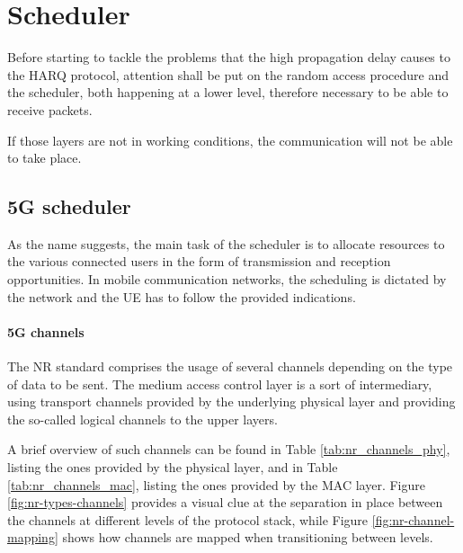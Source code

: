 
\chapter{Scheduler}
\label{chp:scheduling_problems}

Before starting to tackle the problems that the high propagation delay causes to the \ac{HARQ} protocol, attention shall be put on the random access procedure and the scheduler, both happening at a lower level, therefore necessary to be able to receive packets.

If those layers are not in working conditions, the communication will not be able to take place.

\section{5G scheduler}
As the name suggests, the main task of the scheduler is to allocate resources to the various connected users in the form of transmission and reception opportunities. In mobile communication networks, the scheduling is dictated by the network and the \ac{UE} has to follow the provided indications.

\subsubsection{5G channels}
The \ac{NR} standard comprises the usage of several channels depending on the type of data to be sent. The medium access control layer is a sort of intermediary, using transport channels provided by the underlying physical layer and providing the so-called logical channels to the upper layers.

A brief overview of such channels can be found in Table \ref{tab:nr_channels_phy}, listing the ones provided by the physical layer, and in Table \ref{tab:nr_channels_mac}, listing the ones provided by the \ac{MAC} layer. Figure \ref{fig:nr-types-channels} provides a visual clue at the separation in place between the channels at different levels of the protocol stack, while Figure \ref{fig:nr-channel-mapping} shows how channels are mapped when transitioning between levels.

